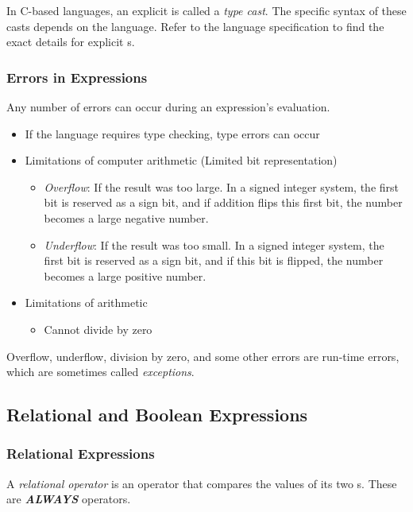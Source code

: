 In C-based languages, an explicit  is called a \emph{type cast}.
The specific syntax of these casts depends on the language.
Refer to the language specification to find the exact details for explicit s.

\subsubsection{Errors in Expressions}\label{subsubsec:Errors_in_Expressions}
Any number of errors can occur during an expression's evaluation.
\begin{itemize}[noitemsep]
\item If the language requires type checking, type errors can occur
\item Limitations of computer arithmetic (Limited bit representation)
  \begin{itemize}[noitemsep]
  \item \emph{Overflow}: If the result was too large. In a signed integer system, the first bit is reserved as a sign bit, and if addition flips this first bit, the number becomes a large negative number.
  \item \emph{Underflow}: If the result was too small. In a signed integer system, the first bit is reserved as a sign bit, and if this bit is flipped, the number becomes a large positive number.
  \end{itemize}
\item Limitations of arithmetic
  \begin{itemize}[noitemsep]
  \item Cannot divide by zero
  \end{itemize}
\end{itemize}

Overflow, underflow, division by zero, and some other errors are run-time errors, which are sometimes called \emph{exceptions}.

\subsection{Relational and Boolean Expressions}\label{subsec:Relational_Boolean_Expressions}
\subsubsection{Relational Expressions}\label{subsubsec:Relational_Expressions}
\begin{definition}\label{def:Relational_Operator}
  A \emph{relational operator} is an operator that compares the values of its two s.
  These are \textbf{\emph{ALWAYS}}  operators.
\end{definition}

